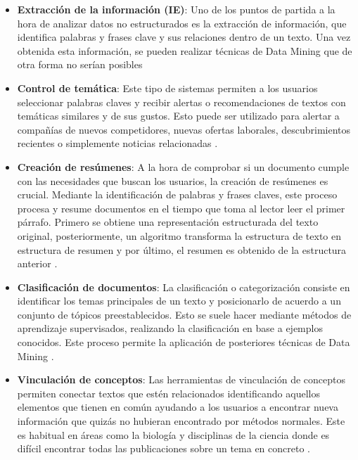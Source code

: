 \documentclass[10pt, a4paper]{article}
\begin{document}
\begin{itemize}
  \item \textbf{Extracción de la información (IE)}: Uno de los puntos de partida a la hora de analizar datos no estructurados es la extracción de información, que identifica palabras y frases clave y sus relaciones dentro de un texto. Una vez obtenida esta información, se pueden realizar técnicas de Data Mining que de otra forma no serían posibles \cite{a survey of text mining techniques and applications, TFG Jorge, libro jorge}
  
  \item \textbf{Control de temática}: Este tipo de sistemas permiten a los usuarios seleccionar palabras claves y recibir alertas o recomendaciones de textos con temáticas similares y de sus gustos. Esto puede ser utilizado para alertar a compañías de nuevos competidores, nuevas ofertas laborales, descubrimientos recientes o simplemente noticias relacionadas \cite{a survey of text mining techniques and applications}.
  
  \item \textbf{Creación de resúmenes}: A la hora de comprobar si un documento cumple con las necesidades que buscan los usuarios, la creación de resúmenes es crucial. Mediante la identificación de palabras y frases claves, este proceso procesa y resume documentos en el tiempo que toma al lector leer el primer párrafo. Primero se obtiene una representación estructurada del texto original, posteriormente, un algoritmo transforma la estructura de texto en estructura de resumen y por último, el resumen es obtenido de la estructura anterior \cite{a survey of text mining techniques and applications}.
  
  \item \textbf{Clasificación de documentos}: La clasificación o categorización consiste en identificar los temas principales de un texto y posicionarlo de acuerdo a un conjunto de tópicos preestablecidos. Esto se suele hacer mediante métodos de aprendizaje supervisados, realizando la clasificación en base a ejemplos conocidos. Este proceso permite la aplicación de posteriores técnicas de Data Mining \cite{a survey of text mining techniques and applications}.
  
  \item \textbf{Vinculación de conceptos}: Las herramientas de vinculación de conceptos permiten conectar textos que estén relacionados identificando aquellos elementos que tienen en común ayudando a los usuarios a encontrar nueva información que quizás no hubieran encontrado por métodos normales. Este es habitual en áreas como la biología y disciplinas de la ciencia donde es difícil encontrar todas las publicaciones sobre un tema en concreto \cite{a survey of text mining techniques and applications}.
  

\end{itemize}
\end{document}
